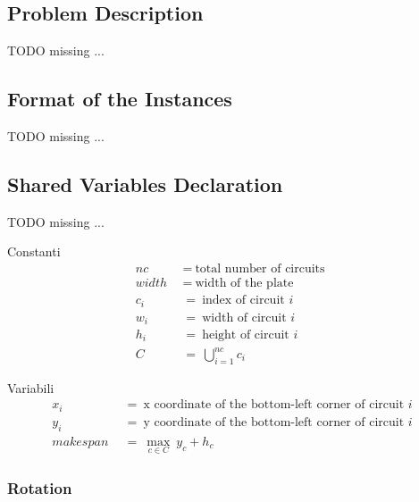 
\subsection{Problem Description}
    \colorbox{BurntOrange}{TODO missing ...}


\subsection{Format of the Instances}
    \colorbox{BurntOrange}{TODO missing ...}


\subsection{Shared Variables Declaration}
    \colorbox{BurntOrange}{TODO missing ...}

    Constanti
    \begin{align*}
        nc\       &\ =\ \text{total number of circuits  } \\
        width\    &\ =\ \text{width of the plate  }       \\
        c_i\      &\ =\ \text{index of circuit  } i       \\
        w_i\      &\ =\ \text{width of circuit  } i       \\
        h_i\      &\ =\ \text{height of circuit  } i      \\
        C\        &\ =\ \bigcup_{i=1}^{nc} c_i
    \end{align*}

    Variabili
    \begin{align*}
        x_i\      &\ =\ \text{x coordinate of the bottom-left corner of circuit  } i \\
        y_i\      &\ =\ \text{y coordinate of the bottom-left corner of circuit  } i \\
        makespan\ &\ =\ \max_{c \in C}\ y_c + h_c
    \end{align*}

    \subsubsection{Rotation}

